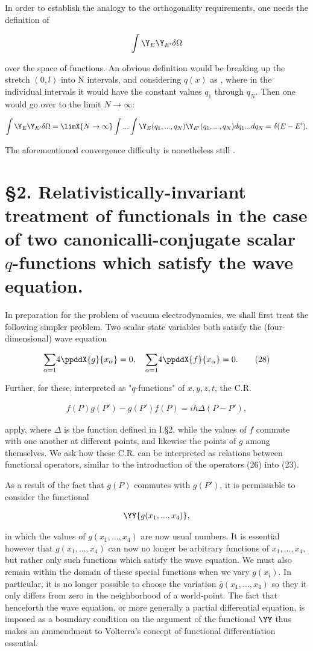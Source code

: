 \documentclass{article}
\newcommand{\nequ}[2]{
\begin{align*}
#1
\tag{#2}
\end{align*}
}
\newcommand{\uequ}[1]{
\begin{align*}
#1
\end{align*}
}
\newcommand{\sumX}[1]{\underset{#1}{\sum}}
\begin{document}
In order to establish the analogy to the orthogonality requirements, one needs the definition of
\uequ{
\int\Y_E \Y_{E'}\delta\Omega
}
over the space of functions. An obvious definition would be breaking up the stretch $(0,l)$ into N intervals, and considering $q(x)$ as , where in the individual intervals it would have the constant values $q_1$ through $q_N$. Then one would go over to the limit $N\to\infty$:
\uequ{
\int\Y_E\Y_{E'}\delta\Omega = \limX{N\to\infty}
\int...\int\Y_E(q_1,...,q_N)\Y_{E'}(q_1,...,q_N)dq_1...dq_N = \delta(E-E').
}
The aforementioned convergence difficulty is nonetheless still .

\section*{§2. Relativistically-invariant treatment of functionals in the case of two canonicalli-conjugate scalar $q$-functions which satisfy the wave equation.}

In preparation for the problem of vacuum electrodynamics, we shall first treat the following simpler problem. Two scalar state variables both satisfy the (four-dimensional) wave equation
\nequ{
\sumX{\alpha=1}{4}\ppddX{g}{x_\alpha} = 0,\quad
\sumX{\alpha=1}{4}\ppddX{f}{x_\alpha} = 0.
}{28}
Further, for these, interpreted as "$q$-functions" of $x,y,z,t$, the C.R.
\nequ{
f(P)g(P') - g(P')f(P) = ih\Delta(P-P'),
}{29}
apply, where $\Delta$ is the function defined in I.§2, while the values of $f$ commute with one another at different points, and likewise the points of $g$ among themselves. We ask how these C.R. can be interpreted as relations between functional operators, similar to the introduction of the operators (26) into (23).

As a result of the fact that $g(P)$ commutes with $g(P')$, it is permissable to consider the functional
\uequ{
\YY\{g(x_1,...,x_4)\},
}
in which the values of $g(x_1,...,x_4)$ are now usual numbers. It is essential however that $g(x_1,...,x_4)$ can now no longer be arbitrary functions of $x_1,...,x_4$, but rather only such functions which satisfy the wave equation. We must also remain within the domain of these special functions when we vary $g(x_i)$. In particular, it is no longer possible to choose the variation $\overline{g}(x_1,...,x_4)$ so they it only differs from zero in the neighborhood of a world-point. The fact that henceforth the wave equation, or more generally a partial differential equation, is imposed as a boundary condition on the argument of the functional $\YY$ thus makes an ammendment to Volterra's concept of functional differentiation essential.
\end{document}

